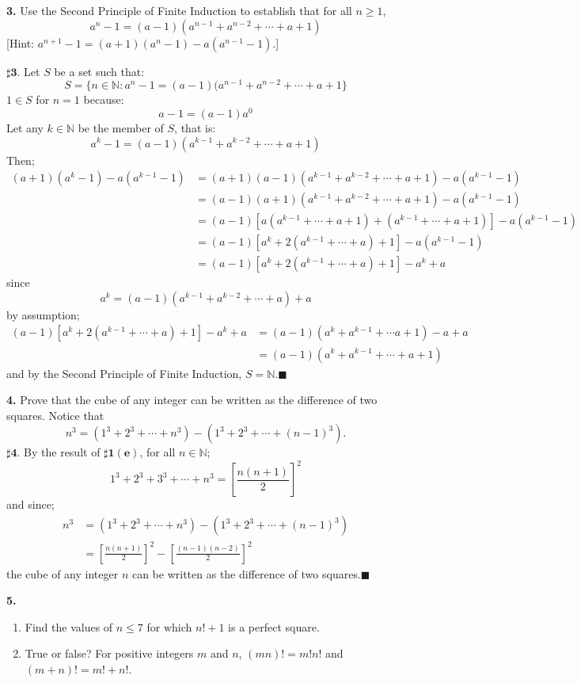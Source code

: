 \documentclass[atbegshi, chapter]{memoir}
\begin{document}
\hfill\break
\textbf{3. }Use the Second Principle of Finite Induction to establish that
for all $n\geq1$,
\[
  a^n-1=(a-1)(a^{n-1}+a^{n-2}+\cdots+a+1)
\]
[Hint: $a^{n+1}-1=(a+1)(a^n-1)-a(a^{n-1}-1)$.]

\hfill\break
$\pmb{\sharp 3.}$ Let $S$ be a set such that:
\[
  S = \big\lbrace n\in\mathbb{N}: a^n-1 = (a-1)(a^{n-1}+a^{n-2}+\cdots+
    a+1\big\rbrace
\]
$1\in S$ for $n=1$ because:
\[
  a-1 = (a-1)a^0
\]
Let any $k\in\mathbb{N}$ be the member of $S$, that is:
\[
  a^k-1 = (a-1)(a^{k-1}+a^{k-2}+\cdots+a+1)
\]
Then;
\begin{align*}
  (a+1)(a^k-1)-a(a^{k-1}-1)
  &=(a+1)(a-1)(a^{k-1}+a^{k-2}+\cdots+a+1)-a(a^{k-1}-1) \\
  &=(a-1)(a+1)(a^{k-1}+a^{k-2}+\cdots+a+1)-a(a^{k-1}-1) \\
  &=(a-1)[a(a^{k-1}+\cdots+a+1)+(a^{k-1}+\cdots+a+1)]-a(a^{k-1}-1) \\
  &=(a-1)[a^k+2(a^{k-1}+\cdots+a)+1]-a(a^{k-1}-1)\\
  &=(a-1)[a^{k}+2(a^{k-1}+\cdots+a)+1]-a^k+a
\end{align*}
since
\[
  a^k=(a-1)(a^{k-1}+a^{k-2}+\cdots+a)+a
\]
by assumption;
\begin{align*}
  (a-1)[a^{k}+2(a^{k-1}+\cdots+a)+1]-a^k+a
  &= (a-1)(a^k+a^{k-1}+\cdots a+1)-a+a \\
  &= (a-1)(a^k+a^{k-1}+\cdots+a+1)
\end{align*}
and by the Second Principle of Finite Induction, 
$S=\mathbb{N}$.\hfill$\blacksquare$

\hfill\break
\textbf{4. }Prove that the cube of any integer can be written as the difference
of two squares. Notice that
\[
  n^3 = (1^3+2^3+\cdots+n^3)-(1^3+2^3+\cdots+(n-1)^3).
\]
$\pmb{\sharp4}.$ By the result of $\pmb{\sharp1(e)}$, for all $n\in\mathbb{N}$;
\[
  1^3+2^3+3^3+\cdots+n^3 = \left[\frac{n(n+1)}{2}\right]^2
\]
and since;
\begin{align*}
  n^3 &= (1^3+2^3+\cdots+n^3)-(1^3+2^3+\cdots+(n-1)^3)\\
      &=\left[\frac{n(n+1)}{2}\right]^2-\left[\frac{(n-1)(n-2)}{2}\right]^2
\end{align*}
the cube of any integer $n$ can be written as the difference of two 
squares.\hfill$\blacksquare$

\hfill\break
\textbf{5. }
\begin{enumerate}[label=(\alph*)]
  \item Find the values of $n\leq7$ for which $n!+1$ is a perfect square.
  \item True or false? For positive integers $m$ and $n$, $(mn)!=m!n!$ and 
    $(m+n)!=m!+n!$.
\end{enumerate}
\end{document}
